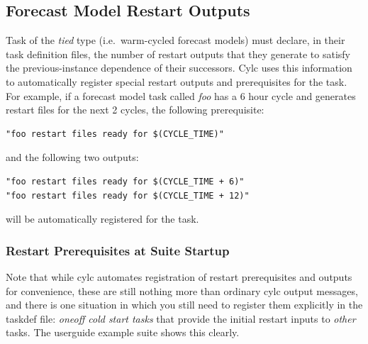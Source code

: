 \documentclass[11pt,a4paper]{article}
\begin{document}
\subsection{Forecast Model Restart Outputs}

Task of the {\em tied} type (i.e.\ warm-cycled forecast models) must
declare, in their task definition files, the number of restart outputs
that they generate to satisfy the previous-instance dependence of their
successors. Cylc uses this information to automatically register special
restart outputs and prerequisites for the task. For example, if a
forecast model task called {\em foo} has a 6 hour cycle and generates
restart files for the next 2 cycles, the following prerequisite:

\begin{lstlisting}
"foo restart files ready for $(CYCLE_TIME)"
\end{lstlisting}

and the following two outputs:

\begin{lstlisting}
"foo restart files ready for $(CYCLE_TIME + 6)"
"foo restart files ready for $(CYCLE_TIME + 12)"
\end{lstlisting}

will be automatically registered for the task.


\subsubsection{Restart Prerequisites at Suite Startup}

Note that while cylc automates registration of restart prerequisites and 
outputs for convenience, these are still nothing more than ordinary cylc
output messages, and there is one situation in which you still need to
register them explicitly in the taskdef file: {\em oneoff cold start
tasks} that provide the initial restart inputs to {\em other} tasks.
The userguide example suite shows this clearly.

\end{document}
